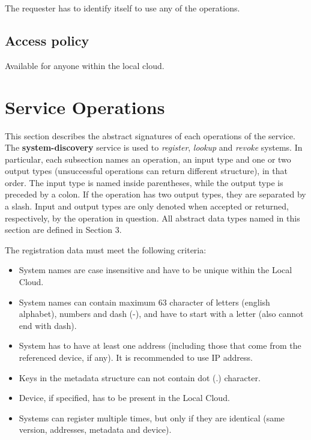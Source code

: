 \documentclass[a4paper]{arrowhead}
\begin{document}
The requester has to identify itself to use any of the operations.

\subsection{Access policy}
\label{sec:accesspolicy}

Available for anyone within the local cloud.

\newpage

\section{Service Operations}
\label{sec:functions}

This section describes the abstract signatures of each operations of the service. The \textbf{system-discovery} service is used to \textit{register}, \textit{lookup} and \textit{revoke} systems.
In particular, each subsection names an operation, an input type and one or two output types (unsuccessful operations can return different structure), in that order.
The input type is named inside parentheses, while the output type is preceded by a colon. If the operation has two output types, they are separated by a slash.
Input and output types are only denoted when accepted or returned, respectively, by the operation in question. All abstract data types named in this section are defined in Section 3.


The registration data must meet the following criteria:

\begin{itemize}
    \item System names are case insensitive and have to be unique within the Local Cloud.
    \item System names can contain maximum 63 character of letters (english alphabet), numbers and dash (-), and have to start with a letter (also cannot end with dash).
    \item System has to have at least one address (including those that come from the referenced device, if any). It is recommended to use IP address. 
    \item Keys in the metadata structure can not contain dot (.) character.
    \item Device, if specified, has to be present in the Local Cloud.
    \item Systems can register multiple times, but only if they are identical (same version, addresses, metadata and device).
\end{itemize}
\end{document}
